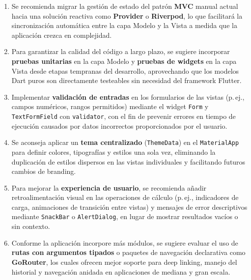 \documentclass[12pt,a4paper]{article}
\begin{document}
\begin{enumerate}
  \item \begin{sloppypar}Se recomienda migrar la gestión de estado del patrón \textbf{MVC} manual actual hacia una solución reactiva como \textbf{Provider} o \textbf{Riverpod}, lo que facilitará la sincronización automática entre la capa Modelo y la Vista a medida que la aplicación crezca en complejidad.\end{sloppypar}

  \item Para garantizar la calidad del código a largo plazo, se sugiere incorporar \textbf{pruebas unitarias} en la capa Modelo y \textbf{pruebas de widgets} en la capa Vista desde etapas tempranas del desarrollo, aprovechando que los modelos Dart puros son directamente testeables sin necesidad del framework Flutter.

  \item \begin{sloppypar}Implementar \textbf{validación de entradas} en los formularios de las vistas (p.\,ej., campos numéricos, rangos permitidos) mediante el widget \texttt{Form} y \texttt{TextFormField} con \texttt{validator}, con el fin de prevenir errores en tiempo de ejecución causados por datos incorrectos proporcionados por el usuario.\end{sloppypar}

  \item Se aconseja aplicar un \textbf{tema centralizado} (\texttt{ThemeData}) en el \texttt{MaterialApp} para definir colores, tipografías y estilos una sola vez, eliminando la duplicación de estilos dispersos en las vistas individuales y facilitando futuros cambios de branding.

  \item Para mejorar la \textbf{experiencia de usuario}, se recomienda añadir retroalimentación visual en las operaciones de cálculo (p.\,ej., indicadores de carga, animaciones de transición entre vistas) y mensajes de error descriptivos mediante \texttt{SnackBar} o \texttt{AlertDialog}, en lugar de mostrar resultados vacíos o sin contexto.

  \item Conforme la aplicación incorpore más módulos, se sugiere evaluar el uso de \textbf{rutas con argumentos tipados} o paquetes de navegación declarativa como \textbf{GoRouter}, los cuales ofrecen mejor soporte para deep linking, manejo del historial y navegación anidada en aplicaciones de mediana y gran escala.
\end{enumerate}
\end{document}
